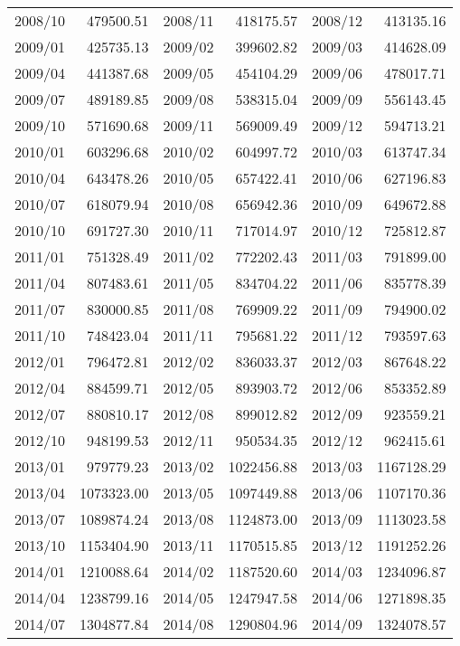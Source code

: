 \begin{center}
\begin{longtable}{rr|rr|rr}
    2008/10 & 479500.51 & 2008/11 & 418175.57 & 2008/12 & 413135.16 \\
    2009/01 & 425735.13 & 2009/02 & 399602.82 & 2009/03 & 414628.09 \\
    2009/04 & 441387.68 & 2009/05 & 454104.29 & 2009/06 & 478017.71 \\
    2009/07 & 489189.85 & 2009/08 & 538315.04 & 2009/09 & 556143.45 \\
    2009/10 & 571690.68 & 2009/11 & 569009.49 & 2009/12 & 594713.21 \\
    2010/01 & 603296.68 & 2010/02 & 604997.72 & 2010/03 & 613747.34 \\
    2010/04 & 643478.26 & 2010/05 & 657422.41 & 2010/06 & 627196.83 \\
    2010/07 & 618079.94 & 2010/08 & 656942.36 & 2010/09 & 649672.88 \\
    2010/10 & 691727.30 & 2010/11 & 717014.97 & 2010/12 & 725812.87 \\
    2011/01 & 751328.49 & 2011/02 & 772202.43 & 2011/03 & 791899.00 \\
    2011/04 & 807483.61 & 2011/05 & 834704.22 & 2011/06 & 835778.39 \\
    2011/07 & 830000.85 & 2011/08 & 769909.22 & 2011/09 & 794900.02 \\
    2011/10 & 748423.04 & 2011/11 & 795681.22 & 2011/12 & 793597.63 \\
    2012/01 & 796472.81 & 2012/02 & 836033.37 & 2012/03 & 867648.22 \\
    2012/04 & 884599.71 & 2012/05 & 893903.72 & 2012/06 & 853352.89 \\
    2012/07 & 880810.17 & 2012/08 & 899012.82 & 2012/09 & 923559.21 \\
    2012/10 & 948199.53 & 2012/11 & 950534.35 & 2012/12 & 962415.61 \\
    2013/01 & 979779.23 & 2013/02 & 1022456.88 & 2013/03 & 1167128.29 \\
    2013/04 & 1073323.00 & 2013/05 & 1097449.88 & 2013/06 & 1107170.36 \\
    2013/07 & 1089874.24 & 2013/08 & 1124873.00 & 2013/09 & 1113023.58 \\
    2013/10 & 1153404.90 & 2013/11 & 1170515.85 & 2013/12 & 1191252.26 \\
    2014/01 & 1210088.64 & 2014/02 & 1187520.60 & 2014/03 & 1234096.87 \\
    2014/04 & 1238799.16 & 2014/05 & 1247947.58 & 2014/06 & 1271898.35 \\
    2014/07 & 1304877.84 & 2014/08 & 1290804.96 & 2014/09 & 1324078.57 \\

\end{longtable}
\end{center}
